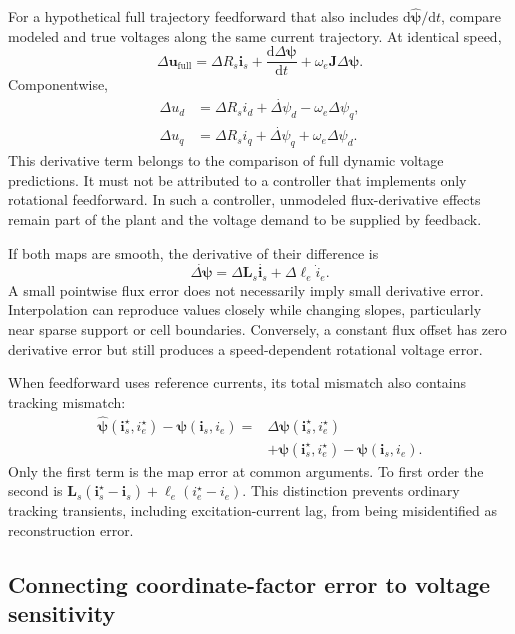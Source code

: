 For a hypothetical full trajectory feedforward that also includes $\mathrm d\widehat{\bm\psi}/\mathrm dt$, compare modeled and true voltages along the same current trajectory. At identical speed,
\begin{equation}
 \Delta\bm u_{\mathrm{full}}
 =\Delta R_s\bm i_s+
 \frac{\mathrm d\Delta\bm\psi}{\mathrm dt}
 +\omega_e\bm J\Delta\bm\psi.
 \label{eq:control-full-feedforward-error}
\end{equation}
Componentwise,
\begin{align}
 \Delta u_d&=\Delta R_si_d+\dot{\Delta\psi}_d
                                  -\omega_e\Delta\psi_q,\\
 \Delta u_q&=\Delta R_si_q+\dot{\Delta\psi}_q
                                  +\omega_e\Delta\psi_d.
\end{align}
This derivative term belongs to the comparison of full dynamic voltage predictions. It must not be attributed to a controller that implements only rotational feedforward. In such a controller, unmodeled flux-derivative effects remain part of the plant and the voltage demand to be supplied by feedback.

If both maps are smooth, the derivative of their difference is
\begin{equation}
 \dot{\Delta\bm\psi}=
 \Delta\bm L_s\dot{\bm i_s}+\Delta\bm\ell_e\dot i_e.
 \label{eq:control-derivative-error}
\end{equation}
A small pointwise flux error does not necessarily imply small derivative error. Interpolation can reproduce values closely while changing slopes, particularly near sparse support or cell boundaries. Conversely, a constant flux offset has zero derivative error but still produces a speed-dependent rotational voltage error.

When feedforward uses reference currents, its total mismatch also contains tracking mismatch:
\begin{align}
 \widehat{\bm\psi}(\bm i_s^\star,i_e^\star)-\bm\psi(\bm i_s,i_e)
 ={}&\Delta\bm\psi(\bm i_s^\star,i_e^\star)\nonumber\\
 &+\bm\psi(\bm i_s^\star,i_e^\star)-\bm\psi(\bm i_s,i_e).
\end{align}
Only the first term is the map error at common arguments. To first order the second is $\bm L_s(\bm i_s^\star-\bm i_s)+\bm\ell_e(i_e^\star-i_e)$. This distinction prevents ordinary tracking transients, including excitation-current lag, from being misidentified as reconstruction error.

\subsection{Connecting coordinate-factor error to voltage sensitivity}


